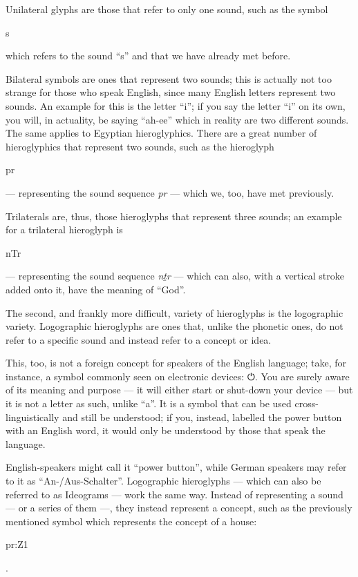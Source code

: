 \documentclass[a5paper,twoside,11pt]{report}
\begin{document}
		Unilateral glyphs are those that refer to only one sound, such as the symbol \begin{hieroglyph}s\end{hieroglyph} which refers to the sound “s” and that we have already met before. 
		
		Bilateral symbols are ones that represent two sounds; this is actually not too strange for those who speak English, since many English letters represent two sounds. An example for this is the letter “i”; if you say the letter “i” on its own, you will, in actuality, be saying “ah-ee” which in reality are two different sounds. The same applies to Egyptian hieroglyphics. There are a great number of hieroglyphics that represent two sounds, such as the hieroglyph \begin{hieroglyph}pr\end{hieroglyph} — representing the sound sequence \textit{pr} — which we, too, have met previously.

		Trilaterals are, thus, those hieroglyphs that represent three sounds; an example for a trilateral hieroglyph is \begin{hieroglyph}nTr\end{hieroglyph} — representing the sound sequence \textit{nṯr} — which can also, with a vertical stroke added onto it, have the meaning of “God”.

		The second, and frankly more difficult, variety of hieroglyphs is the logographic variety. Logographic hieroglyphs are ones that, unlike the phonetic ones, do not refer to a specific sound and instead refer to a concept or idea. 

		This, too, is not a foreign concept for speakers of the English language; take, for instance, a symbol commonly seen on electronic devices: ⏻. You are surely aware of its meaning and purpose — it will either start or shut-down your device — but it is not a letter as such, unlike “a”. It is a symbol that can be used cross-linguistically and still be understood; if you, instead, labelled the power button with an English word, it would only be understood by those that speak the language.

		English-speakers might call it “power button”, while German speakers may refer to it as “An-/Aus-Schalter”. Logographic hieroglyphs — which can also be referred to as Ideograms — work the same way. Instead of representing a sound — or a series of them —, they instead represent a concept, such as the previously mentioned symbol which represents the concept of a house: \begin{hieroglyph}pr:Z1\end{hieroglyph}.
\end{document}
